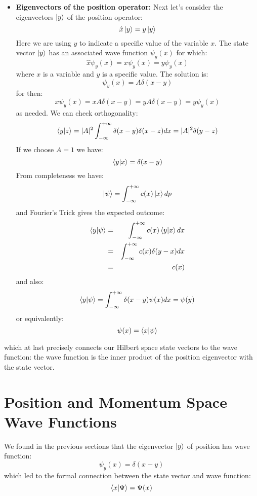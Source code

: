 \documentclass[12pt]{book}
\begin{document}
\begin{itemize}
\item {\bf Eigenvectors of the position operator:}  Next let's consider the eigenvectors $\ket{y}$ of the position operator:
$$\hat{x} \ket{y} = y \ket{y}$$
Here we are using $y$ to indicate a specific value of the variable $x$.  The state vector $\ket{y}$ has an associated wave function $\psi_y(x)$ for which:
$$\hat{x} \psi_y(x) = x \psi_y(x) = y \psi_y(x)$$
where $x$ is a variable and $y$ is a specific value.  The solution is:
$$\psi_y(x) = A \delta(x-y)$$
for then:
$$x \psi_y(x) = x A \delta(x-y) = y A \delta(x-y) = y \psi_y(x)$$
as needed.  We can check orthogonality:
$$\braket{y|z} = |A|^2 \int_{-\infty}^{+\infty} \delta(x-y) \delta(x-z) dx = |A|^2 \delta(y-z)$$
If we choose $A=1$ we have:
$$\braket{y|x} = \delta(x-y)$$
From completeness we have:
$$\ket{\psi} = \int_{-\infty}^{+\infty} c(x) \ket{x} dp $$
and Fourier's Trick gives the expected outcome:
\begin{eqnarray*}
\braket{y|\psi} &=& \int_{-\infty}^{+\infty} c(x) \braket{y|x} dx \\
                &=& \int_{-\infty}^{+\infty} c(x) \delta(y-x) dx \\
                &=& c(x) \\
\end{eqnarray*}
and also:
$$\braket{y|\psi} = \int_{-\infty}^{+\infty} \delta(x-y) \psi(x) dx = \psi(y)$$
or equivalently:
$$\psi(x) = \braket{x|\psi}$$
\end{itemize}
which at last precisely connects our Hilbert space state vectors to the wave function: the wave function is the inner product of the position eigenvector with the state vector.

\section{Position and Momentum Space Wave Functions}

We found in the previous sections that the eigenvector $\ket{y}$ of position has wave function:
$$\psi_y(x) = \delta(x-y)$$
which led to the formal connection between the state vector and wave function:
$$\braket{x|\Psi} = \Psi(x)$$
\end{document}
